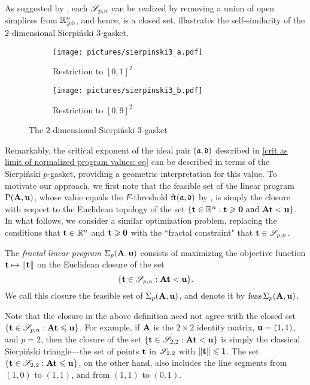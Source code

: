 \documentclass{amsart}
\begin{document}
As suggested by , each $\mathscr{S}_{p,n}$  can be realized by removing a union of open simplices from $\mathbb{R}_{\geqslant 0}^n$, and hence, is a closed set.
 illustrates the self-similarity of the $2$-dimensional Sierpi\'nski $3$-gasket.

\begin{figure}
\begin{subfigure}{.49\textwidth}
  \centering
  \texttt{[image: pictures/sierpinski3\_a.pdf]}
  \caption{Restriction to $[0,1]^2$}
\end{subfigure}
\begin{subfigure}{.49\textwidth}
  \centering
  \texttt{[image: pictures/sierpinski3\_b.pdf]}
  \caption{Restriction to $[0,9]^2$}
\end{subfigure}
\caption{The $2$-dimensional Sierpi\'nski 3-gasket}
\label{fig: sierpinski 3-gasket}
\end{figure}

Remarkably, the critical exponent of the ideal pair $(\mathfrak{a}, \mathfrak{d})$ described in \eqref{crit as limit of normalized program values: eq} can be described in terms of the Sierpi\'nski $p$-gasket, providing a geometric interpretation for this value.
To motivate our approach, we first note that the feasible set of the linear program $\mathrm{P}(\mathbf{A}, \mathbf{u})$, whose value equals the $F$-threshold $\operatorname{ft}(\mathfrak{a}, \mathfrak{d})$ by , is simply the closure with respect to the Euclidean topology of the set $\{ \mathbf{t} \in \mathbb{R}^n : \mathbf{t} \geqslant \mathbf{0} \text{ and } \mathbf{A}\mathbf{t} < \mathbf{u} \}$.
In what follows, we consider a similar optimization problem,  replacing the conditions that $\mathbf{t} \in \mathbb{R}^n$ and $\mathbf{t} \geqslant \mathbf{0}$ with the ``fractal constraint" that $\mathbf{t} \in \mathscr{S}_{p,n}$.

\begin{definition}
\label{fractal program: D}
The \emph{fractal linear program} $\Sigma_p(\mathbf{A},\mathbf{u})$ consists of maximizing the objective function $\mathbf{t}\mapsto \| \mathbf{t} \|$ on the Euclidean closure of the set \[ \{ \mathbf{t} \in \mathscr{S}_{p,n} : \mathbf{A} \mathbf{t} < \mathbf{u} \}.\]  We call this closure the feasible set of $\Sigma_p(\mathbf{A}, \mathbf{u})$, and denote it by $\operatorname{feas} \Sigma_p(\mathbf{A}, \mathbf{u})$.
\end{definition}

\begin{remark}
Note that the closure in the above definition need not agree with the closed set $\{ \mathbf{t} \in \mathscr{S}_{p,n} : \mathbf{A} \mathbf{t} \leqslant \mathbf{u} \}$.
For example, if $\mathbf{A}$ is the $2\times 2$ identity matrix, $\mathbf{u} = (1,1)$, and $p=2$, then the closure of the set $\{ \mathbf{t} \in \mathscr{S}_{2,2} : \mathbf{A} \mathbf{t} < \mathbf{u} \}$ is simply the classical Sierpi\'nski triangle---the set of points $\mathbf{t}$ in $\mathscr{S}_{2,2}$ with $\| \mathbf{t} \| \leqslant 1$.
The set $\{ \mathbf{t} \in \mathscr{S}_{2,2} : \mathbf{A} \mathbf{t} \leqslant \mathbf{u} \}$, on the other hand, also includes the line segments from $(1,0)$ to $(1,1)$, and from $(1,1)$ to $(0,1)$.
\end{remark}
\end{document}
